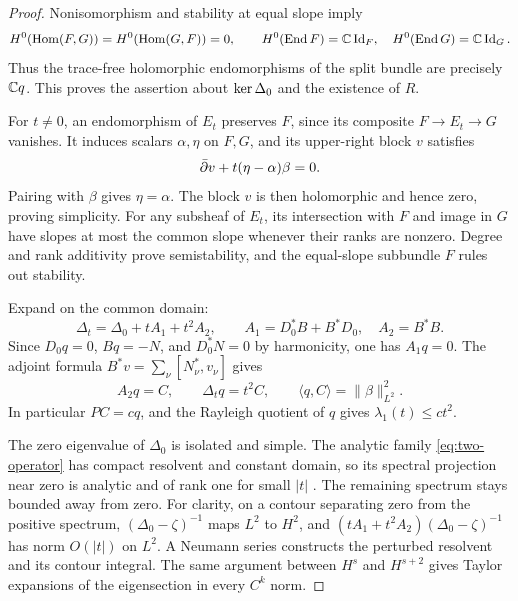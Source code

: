 \begin{proof}
Nonisomorphism and stability at equal slope imply
\[
 H^0(\operatorname{Hom}(F,G))=H^0(\operatorname{Hom}(G,F))=0,\qquad
 H^0(\operatorname{End} F)=\mathbb C\operatorname{Id}_F,\quad H^0(\operatorname{End} G)=\mathbb C\operatorname{Id}_G.
\]
Thus the trace-free holomorphic endomorphisms of the split bundle are
precisely $\mathbb C q$. This proves the assertion about $\operatorname{ker}\Delta_0$ and
the existence of $R$.

For $t\ne0$, an endomorphism of $E_t$ preserves $F$, since its composite
$F\to E_t\to G$ vanishes. It induces scalars $\alpha,\eta$ on $F,G$,
and its upper-right block $v$ satisfies
\[
 \bar\partial v+t(\eta-\alpha)\beta=0.
\]
Pairing with $\beta$ gives $\eta=\alpha$. The block $v$ is then
holomorphic and hence zero, proving simplicity. For any subsheaf of
$E_t$, its intersection with $F$ and image in $G$ have slopes at most
the common slope whenever their ranks are nonzero. Degree and rank
additivity prove semistability, and the equal-slope subbundle $F$
rules out stability.

Expand on the common domain:
\begin{equation}\label{eq:two-operator}
 \Delta_t=\Delta_0+tA_1+t^2A_2,\qquad
 A_1=D_0^*B+B^*D_0,\quad A_2=B^*B.
\end{equation}
Since $D_0q=0$, $Bq=-N$, and $D_0^*N=0$ by harmonicity, one has
$A_1q=0$. The adjoint formula
$B^*v=\sum_\nu[N_\nu^*,v_\nu]$ gives
\begin{equation}\label{eq:two-action}
 A_2q=C,\qquad \Delta_tq=t^2C,\qquad
 \langle q,C\rangle=\lVert\beta\rVert_{L^2}^2.
\end{equation}
In particular $PC=cq$, and the Rayleigh quotient of $q$ gives
$\lambda_1(t)\le ct^2$.

The zero eigenvalue of $\Delta_0$ is isolated and simple. The analytic
family \eqref{eq:two-operator} has compact resolvent and constant domain,
so its spectral projection near zero is analytic and of rank one for
small $|t|$ \cite[Chapter~VII]{Kato1995}. The remaining spectrum stays
bounded away from zero. For clarity, on a contour separating zero from
the positive spectrum, $(\Delta_0-\zeta)^{-1}$ maps $L^2$ to $H^2$,
and
$(tA_1+t^2A_2)(\Delta_0-\zeta)^{-1}$ has norm $O(|t|)$ on $L^2$.
A Neumann series constructs the perturbed resolvent and its contour
integral. The same argument between $H^s$ and $H^{s+2}$ gives Taylor
expansions of the eigensection in every $C^k$ norm.


\end{proof}
